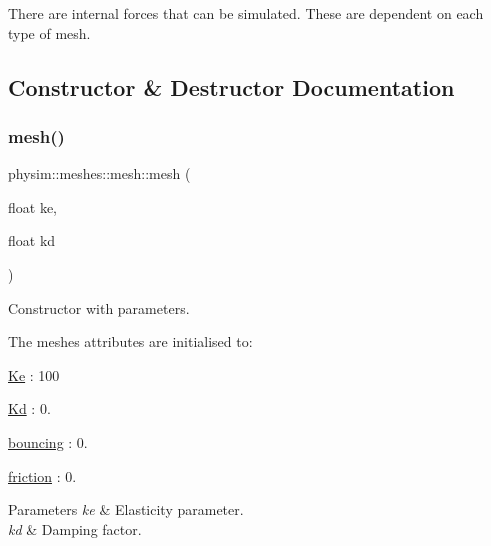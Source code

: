 There are internal forces that can be simulated. These are dependent on each type of mesh. 

\subsection{Constructor \& Destructor Documentation}
\mbox{\label{classphysim_1_1meshes_1_1mesh_a853728b532513cf9fe5f0df25f88358f}} 
\subsubsection{\texorpdfstring{mesh()}{mesh()}}
{\footnotesize\ttfamily physim\+::meshes\+::mesh\+::mesh (\begin{DoxyParamCaption}\item[{float}]{ke,  }\item[{float}]{kd }\end{DoxyParamCaption})}



Constructor with parameters. 

The meshe\textquotesingle{}s attributes are initialised to\+:
\begin{DoxyItemize}
\item \hyperlink{classphysim_1_1meshes_1_1mesh_ab5afc13f5931c6a9df16d5ee49edc453}{Ke} \+: 100
\item \hyperlink{classphysim_1_1meshes_1_1mesh_abba546f70a90e7678efc5b746cf1ccd1}{Kd} \+: 0.
\item \hyperlink{classphysim_1_1meshes_1_1mesh_a90dc28ae4b66272d40615cb55596383a}{bouncing} \+: 0.
\item \hyperlink{classphysim_1_1meshes_1_1mesh_a131fe4688049ea2ec62ef108aee1944c}{friction} \+: 0. 
\begin{DoxyParams}{Parameters}
{\em ke} & Elasticity parameter. \\
\hline
{\em kd} & Damping factor. \\
\hline
\end{DoxyParams}

\end{DoxyItemize}\mbox{\label{classphysim_1_1meshes_1_1mesh_a51250a9f06eabd7cf05c0af7c3d7138c}} 
